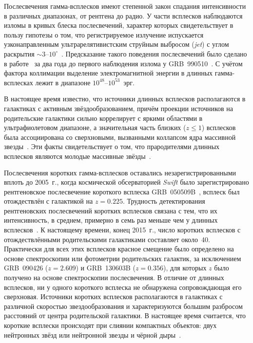 Послесвечения гамма-всплесков имеют степенной закон спадания интенсивности в различных
диапазонах, от рентгена до радио. У части всплесков наблюдаются изломы в кривых блеска послесвечений,
характер которых свидетельствует в пользу гипотезы о том, что регистрируемое излучение испускается
узконаправленным ультрарелятивистским струйным выбросом (\textit{jet}) с углом раскрытия 
$\sim 3\mbox{--}10^{\circ}$~\citep{Rhoads_1999ApJ}. 
Предсказание такого поведения послесвечений было сделано в работе~\citep{Rhoads_1997ApJL} 
за два года до первого наблюдения излома у GRB~990510~\citep{Stanek_1999ApJ}. 
С учётом фактора коллимации выделение электромагнитной энергии в длинных 
гамма-всплесках лежит в диапазоне $10^{48}$--$10^{53}$~эрг.

В настоящее время известно, что источники длинных всплесков располагаются в галактиках 
с активным звёздообразованием, причём проекции источников на родительские галактики сильно
коррелирует с яркими областями в ультрафиолетовом диапазоне, а значительная часть 
близких ($z \le 1$) всплесков была ассоциирована со сверхновыми, вызванными 
коллапсом ядра массивной звезды~\citep{Hjorth_and_Bloom_2012in_book}.
Эти факты свидетельствует о том, что прародителями длинных всплесков являются молодые 
массивные звёзды~\citep[см. обзор][]{Berger_2014ARAA}.

Послесвечения коротких гамма-всплесков оставались незарегистрированными вплоть 
до 2005~г., когда космической обсерваторией \textit{Swift} было зарегистрировано 
рентгеновское послесвечение короткого всплеска GRB~050509B~\citep{Gehrels_2005Natur},
всплеск был отождествлён с галактикой на $z=0.225$. 
Трудность детектирования рентгеновских послесвечений коротких всплесков 
связана с тем, что их интенсивность, в среднем, примерно в семь раз меньше чем у 
длинных всплесков~\citep{Berger_2014ARAA}. 
К настоящему времени, конец 2015~г., число коротких всплесков с отождествлёнными 
родительскими галактиками составляет около~40. 
Практически для всех этих всплесков красное смещение было определено на основе 
спектроскопии или фотометрии родительских галактик, 
за исключением GRB~090426 ($z = 2.609$) и GRB~130603B ($z = 0.356$), 
для которых $z$ было получено на основе спектроскопии послесвечения.
В отличие от длинных всплесков, ни у одного короткого всплеска не обнаружена сопровождающая его сверхновая.
Источники коротких всплесков располагаются в галактиках с различной скоростью 
звездообразования и характеризуются большим разбросом расстояний от центра родительской галактики. 
В настоящее время считается, что короткие всплески происходят при слиянии компактных 
объектов: двух нейтронных звёзд или нейтронной звезды и чёрной дыры~\citep{Berger_2014ARAA}.

